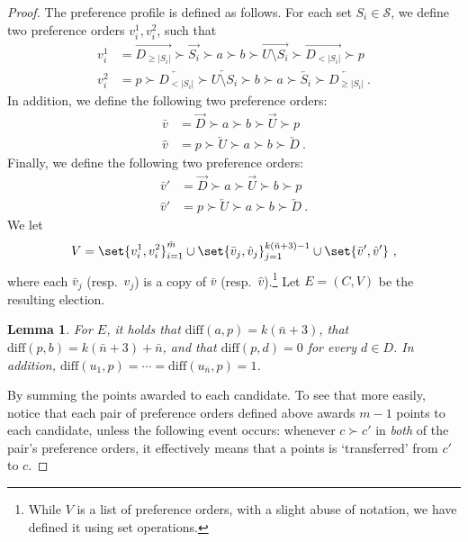 \documentclass[letterpaper]{article} %
\newtheorem{lemma}{Lemma}
\newcommand{\ora}[1]{\overrightarrow{#1}}
\newcommand{\ola}[1]{\overleftarrow{#1}}
\newcommand{\abs}[1]{\lvert{#1}\rvert}
\newcommand{\diff}{\mathrm{diff}}
\begin{document}
\begin{proof}
The preference profile is defined as follows. For each set $S_i \in \mathcal{S}$, we define two preference orders $v_i^1,v_i^2$, such that
\begin{align}
    v_i^1 &= \ora{D_{\geq \abs{S_i}}} \succ  \ora{S_i}  \succ  a \succ b \succ \ora{U \setminus S_i}\succ \ora{D_{<\abs{S_i}}} \succ p   \\
    v_i^2 &=  p  \succ \ola{D_{<\abs{S_i}}} \succ \ola{U \setminus S_i} \succ b \succ a \succ \ola{S_i} \succ  \ola{D_{\geq \abs{S_i}}}\ . 
\end{align}
In addition, we define the following two preference orders:
\begin{align}
    \bar{v} &=  \ora{D} \succ a \succ b \succ  \ora{U}  \succ p \\
    \hat{v} &=  p \succ \ola{U}  \succ a \succ b \succ \ola{D} \ . 
\end{align}
Finally, we define the following two preference orders:
\begin{align}
    \bar{v}' &= \ora{D} \succ a \succ \ora{U} \succ b  \succ p  \\
    \hat{v}' &=  p \succ \ola{U}  \succ a \succ b \succ \ola{D}\ . 
\end{align}
We let 
$$V=\set{v_i^1,v_i^2}_{i=1}^{\bar{m}} \cup \set{\bar{v}_j, \hat{v}_j}_{j=1}^{k(\bar{n}+3)-1} \cup \set{\bar{v}', \hat{v}'}\ ,$$ 
where each $\bar{v}_j$ (resp.\  $\hat{v}_j$) is a copy of $\bar{v}$ (resp.\  $\hat{v}$).\footnote{While $V$ is a list of preference orders, with a slight abuse of notation, we have defined it using set operations.} Let $E = (C,V)$ be the resulting election. 
\begin{lemma}
For $E$, it holds that  $\diff(a,p)=k(\bar{n}+3)$,  that $\diff(p,b)= k(\bar{n}+3) + \bar{n}$, and that
  $\diff(p,d)= 0$  for every $d \in D$. In addition, $\diff(u_1,p)=\cdots=\diff(u_{\bar{n}},p)=1$.
\end{lemma}
By summing the points awarded to each candidate. To see that more easily, notice that each pair of preference orders defined above awards $m-1$ points to each candidate, unless the following event occurs: whenever $c \succ c'$ in \emph{both} of the pair's preference orders, it effectively means that a points is `transferred' from $c'$ to $c$.


\end{proof}
\end{document}

